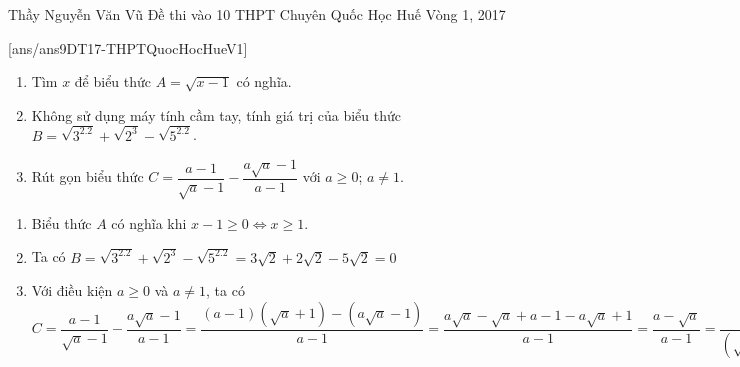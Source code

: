 
\begin{name}
{Thầy  Nguyễn Văn Vũ}
{Đề thi vào 10 THPT Chuyên Quốc Học Huế Vòng 1, 2017}
\end{name}
\setcounter{ex}{0}
[ans/ans9DT17-THPTQuocHocHueV1]
\begin{ex}%
    \hfill
    \begin{enumerate}
        \item Tìm $x$ để biểu thức $A=\sqrt{x-1}$ có nghĩa.
        \item Không sử dụng máy tính cầm tay, tính giá trị của biểu thức $B=\sqrt{3^2.2}+\sqrt{2^3}-\sqrt{5^2.2}$.
        \item Rút gọn biểu thức $C=\dfrac{a-1}{\sqrt{a}-1}-\dfrac{a\sqrt{a}-1}{a-1}$ với $a \geq 0$; $a\neq 1$.
    \end{enumerate}
\loigiai
    {
    \begin{enumerate}
        \item Biểu thức $A$ có nghĩa khi $x-1 \geq 0 \Leftrightarrow x\geq 1$.
        \item Ta có $B=\sqrt{3^2.2}+\sqrt{2^3}-\sqrt{5^2.2}=3\sqrt{2}+2\sqrt{2}-5\sqrt{2}=0$
        \item Với điều kiện $a \geq 0$ và $a\neq 1$, ta có $C=\dfrac{a-1}{\sqrt{a}-1}-\dfrac{a\sqrt{a}-1}{a-1}=\dfrac{(a-1)(\sqrt{a}+1)-(a\sqrt{a}-1)}{a-1}=\dfrac{a\sqrt{a}-\sqrt{a}+a-1-a\sqrt{a}+1}{a-1}=\dfrac{a-\sqrt{a}}{a-1}=\dfrac{\sqrt{a}(\sqrt{a}-1)}{(\sqrt{a}-1)(\sqrt{a}+1)}=\dfrac{\sqrt{a}}{\sqrt{a}+1}$
    \end{enumerate}
    }
\end{ex}



